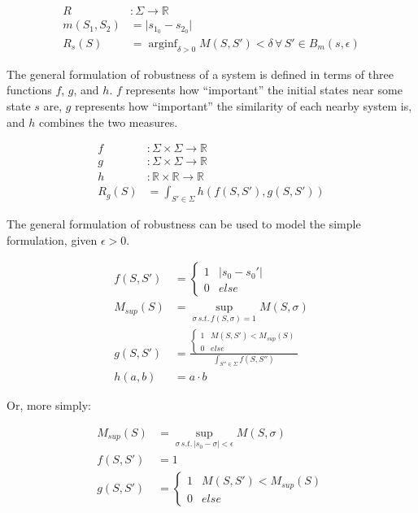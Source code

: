 \documentclass{article}
\DeclareMathOperator*{\arginf}{arginf}
\begin{document}
\begin{align}
  R &: \Sigma \to \mathbb{R} \\
  m(S_1, S_2) &= \lvert s_{1_0} - s_{2_0} \rvert \label{example-metric} \\
  R_s(S) &= \arginf_{\delta > 0} M(S, S') < \delta \,\forall\, S' \in B_m(s, \epsilon)
\end{align}

The general formulation of robustness of a system is defined in terms of three functions $f$, $g$, and $h$. $f$ represents how ``important'' the initial states near some state $s$ are, $g$ represents how ``important'' the similarity of each nearby system is, and $h$ combines the two measures.

\begin{align}
  f &: \Sigma \times \Sigma \to \mathbb{R} \\
  g &: \Sigma \times \Sigma \to \mathbb{R} \\
  h &: \mathbb{R} \times \mathbb{R} \to \mathbb{R} \\
  R_g(S) &= \int_{S' \in \Sigma} h(f(S, S'), g(S, S'))
\end{align}

The general formulation of robustness can be used to model the simple formulation, given $\epsilon > 0$.

\begin{align}
  f(S, S') &= \begin{cases}
    1 & \lvert s_0 - s_0' \rvert \\
    0 & else
  \end{cases} \\
  M_{sup}(S) &= \sup\limits_{\sigma \,s.t.\, f(S, \sigma) = 1} M(S, \sigma) \\
  g(S, S') &= \frac{\begin{cases}
    1 & M(S, S') < M_{sup}(S) \\
    0 & else
  \end{cases}}{\int_{S'' \in \Sigma} f(S, S'')} \\
  h(a, b) &= a \cdot b
\end{align}

Or, more simply:

\begin{align}
  M_{sup}(S) &= \sup\limits_{\sigma \,s.t.\, \lvert s_0 - \sigma \rvert < \epsilon} M(S, \sigma) \\
  f(S, S') &= 1 \\
  g(S, S') &= \begin{cases}
    1 & M(S, S') < M_{sup}(S) \\
    0 & else
  \end{cases}
\end{align}
\end{document}
